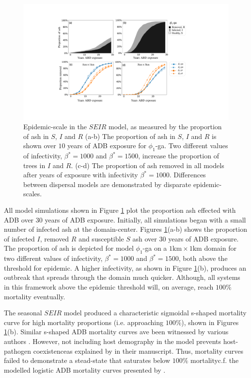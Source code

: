\begin{figure}
    \centering
    \includegraphics[scale=0.42]{chapter6/figures/fig6-mortality.pdf}
    \caption{Epidemic-scale in the $SEIR$ model, as measured by the proportion of ash in $S$, $I$ and $R$ (a-b) The proportion of ash in $S$, $I$ and $R$ is shown over $10$ years of ADB exposure for $\phi_1$-ga. Two different values of infectivity, $\beta^*=1000$ and $\beta^*=1500$, increase the proportion of trees in $I$ and $R$. (c-d) The proportion of ash removed in all models after years of exposure with infectivity $\beta^*=1000$. Differences between dispersal models are demonstrated by disparate epidemic-scales.}
    \label{fig:ash-mortalty}
\end{figure}

All model simulations shown in Figure \ref{fig:ash-mortalty} plot the proportion ash effected with ADB over $30$ years of ADB exposure.
Initially, all simulations began with a small number of infected ash at the domain-center.
Figures \ref{fig:ash-mortalty}(a-b) shows the proportion of infected $I$, removed $R$ and susceptible $S$ ash over $30$ years of ADB exposure.
The proportion of ash is depicted for model $\phi_1$-ga on a $1\mathrm{km}\times 1 \mathrm{km}$ domain for two different values of infectivity, $\beta^*=1000$ and $\beta^*=1500$, both above the threshold for epidemic.
A higher infectivity, as shown in Figure \ref{fig:ash-mortalty}(b), produces an outbreak that spreads through the domain much quicker.
Although, all systems in this framework above the epidemic threshold will, on average, reach $100\%$ mortality eventually.

The seasonal $SEIR$ model produced a characteristic sigmoidal s-shaped mortality curve for high mortality proportions (i.e. approaching $100\%$), shown in Figures \ref{fig:ash-mortalty}(b).
Similar s-shaped ADB mortality curves ave been witnessed by various authors \cite{https://doi.org/10.1002/ppp3.11, lohmus2014ash}.
However, not including host demography in the model prevents host-pathogen coexistence\textemdash as explained by \cite{time-varying-infectivity} in their manuscript.
Thus, mortality curves failed to demonstrate a stead-state that saturates below $100\%$ mortality\textemdash c.f. the modelled logistic ADB mortality curves presented by \cite{https://doi.org/10.1002/ppp3.11}.

